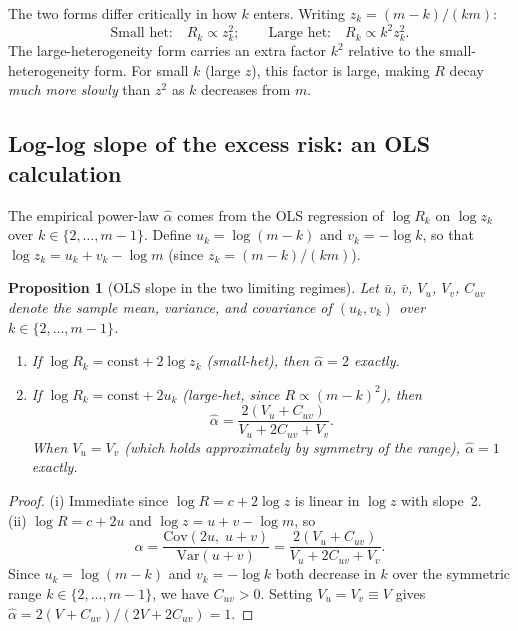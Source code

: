 \documentclass[12pt]{article}
\newtheorem{proposition}{Proposition}
\theoremstyle{definition}
\begin{document}
\medskip

The two forms differ critically in how $k$ enters.
Writing $z_k = (m-k)/(km)$:
\[
  \text{Small het:}\quad R_k \propto z_k^2;
  \qquad
  \text{Large het:}\quad R_k \propto k^2 z_k^2.
\]
The large-heterogeneity form carries an extra factor $k^2$ relative to the
small-heterogeneity form.  For small $k$ (large $z$), this factor is large,
making $R$ decay \emph{much more slowly} than $z^2$ as $k$ decreases from $m$.

\subsection{Log-log slope of the excess risk: an OLS calculation}

The empirical power-law $\hat\alpha$ comes from the OLS regression of
$\log R_k$ on $\log z_k$ over $k \in \{2,\ldots,m-1\}$.
Define $u_k = \log(m-k)$ and $v_k = -\log k$, so that
$\log z_k = u_k + v_k - \log m$ (since $z_k = (m-k)/(km)$).

\begin{proposition}[OLS slope in the two limiting regimes]\label{prop:slope}
  Let $\bar u$, $\bar v$, $V_u$, $V_v$, $C_{uv}$ denote the sample mean, variance, and
  covariance of $(u_k, v_k)$ over $k \in \{2,\ldots,m-1\}$.
  \begin{enumerate}
    \item[(i)] If $\log R_k = \text{const} + 2\log z_k$ (small-het),
               then $\hat\alpha = 2$ exactly.
    \item[(ii)] If $\log R_k = \text{const} + 2u_k$ (large-het, since $R \propto (m-k)^2$),
               then
               \[
                 \hat\alpha = \frac{2(V_u + C_{uv})}{V_u + 2C_{uv} + V_v}.
               \]
               When $V_u = V_v$ (which holds approximately by symmetry of the
               range), $\hat\alpha = 1$ exactly.
  \end{enumerate}
\end{proposition}

\begin{proof}
  (i) Immediate since $\log R = c + 2\log z$ is linear in $\log z$ with slope~2. \\
  (ii) $\log R = c + 2u$ and $\log z = u + v - \log m$, so
  \[
    \hat\alpha
    = \frac{\mathrm{Cov}(2u,\; u+v)}{\mathrm{Var}(u+v)}
    = \frac{2(V_u + C_{uv})}{V_u + 2C_{uv} + V_v}.
  \]
  Since $u_k = \log(m-k)$ and $v_k = -\log k$ both decrease in $k$ over the
  symmetric range $k\in\{2,\ldots,m-1\}$, we have $C_{uv} > 0$.
  Setting $V_u = V_v \equiv V$ gives $\hat\alpha = 2(V+C_{uv})/(2V+2C_{uv}) = 1$.
\end{proof}
\end{document}
